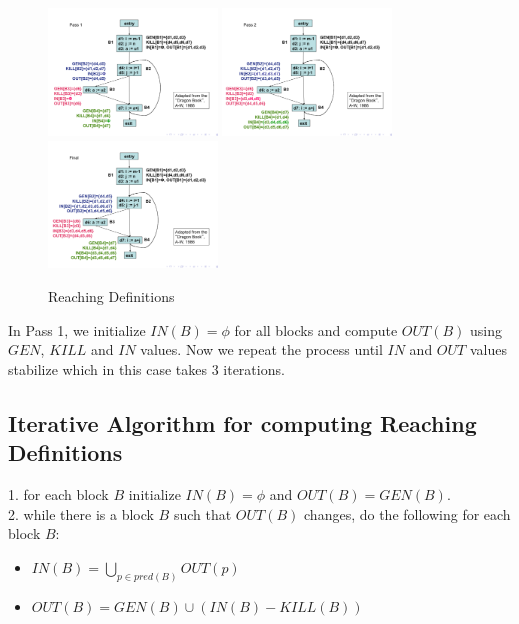 \documentclass{article}
\begin{document}
\begin{figure}[h]
    \centering
    \includegraphics[width=0.4\textwidth]{Images/reaching1.png}
    \includegraphics[width=0.4\textwidth]{Images/reaching2.png}
    \includegraphics[width=0.4\textwidth]{Images/reaching3.png}
    \caption{Reaching Definitions}
    \label{fig:ReachingDefinitions}
\end{figure}

\newpage

In Pass 1, we initialize $IN(B) = \phi$ for all blocks and compute $OUT(B)$ using $GEN$, $KILL$ and $IN$ values. Now we repeat the process until $IN$ and $OUT$ values stabilize which in this case takes 3 iterations. \\

\subsection*{Iterative Algorithm for computing Reaching Definitions}
1. for each block $B$ initialize $IN(B) = \phi$ and $OUT(B) = GEN(B)$. \\
2. while there is a block $B$ such that $OUT(B)$ changes, do the following for each block $B$: \\
\begin{itemize}
    \item $IN(B) = \bigcup_{p \in pred(B)} OUT(p)$
    \item $OUT(B) = GEN(B) \cup (IN(B) - KILL(B))$
\end{itemize}
\end{document}
